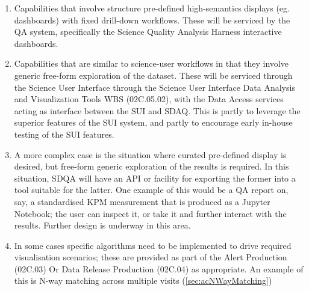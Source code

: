 \begin{enumerate}

\item Capabilities that involve structure pre-defined high-semantics displays (eg. dashboards) with fixed drill-down workflows. These will be serviced by the QA system, specifically the Science Quality Analysis Harness interactive dashboards.

\item Capabilities that are similar to science-user workflows in that they involve generic free-form exploration of the dataset. These will be serviced through the Science User Interface through the Science User Interface Data Analysis and Visualization Tools WBS (02C.05.02), with the Data Access services acting as interface between the SUI and SDAQ. This is partly to leverage the superior features of the SUI system, and partly to encourage early in-house testing of the SUI features.

\item A more complex case is the situation where curated pre-defined display is desired, but free-form generic exploration of the results is required. In this situation, SDQA will have an API or facility for exporting the former into a tool suitable for the latter. One example of this would be a QA report on, say, a standardised KPM measurement that is produced as a Jupyter Notebook; the user can inspect it, or take it and further interact with the results. Further design is underway in this area.

\item In some cases specific algorithms need to be implemented to drive required visualisation scenarios; these are provided as part of the Alert Production (02C.03) Or Data Release Production (02C.04) as appropriate. An example of this is N-way matching across multiple visits (\ref{sec:acNWayMatching})

\end{enumerate}

